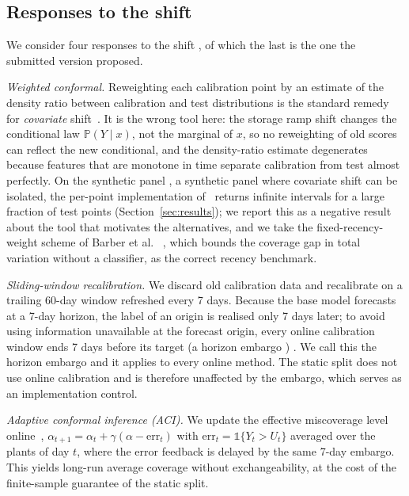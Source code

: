 \documentclass[preprint,3p,times]{elsarticle}
\providecommand{\DIFaddtex}[1]{{\protect\color{blue} \sf #1}} %
\providecommand{\DIFdeltex}[1]{{\protect\color{red} \scriptsize #1}} %
\providecommand{\DIFaddbegin}{} %
\providecommand{\DIFaddend}{} %
\providecommand{\DIFdelbegin}{} %
\providecommand{\DIFdelend}{} %
\providecommand{\DIFadd}[1]{\texorpdfstring{\DIFaddtex{#1}}{#1}} %
\providecommand{\DIFdel}[1]{\texorpdfstring{\DIFdeltex{#1}}{}} %
\begin{document}
\subsection{Responses to the shift}
\label{sec:respuestas}

\DIFaddend We consider four responses\DIFdelbegin \DIFdel{to the shift}\DIFdelend \DIFaddbegin \DIFadd{, of which the last is the one the submitted version proposed}\DIFaddend .

\emph{Weighted conformal.} Reweighting each calibration point by an estimate of the density ratio between calibration and test distributions is the standard remedy for \emph{covariate} shift~\cite{tibshirani2019}. It is the wrong tool here: the \DIFdelbegin \DIFdel{storage ramp }\DIFdelend \DIFaddbegin \DIFadd{shift }\DIFaddend changes the conditional law $\mathbb{P}(Y\mid x)$, not the marginal of $x$, so no reweighting of old scores can reflect the new conditional, and the density-ratio estimate degenerates because features that are monotone in time separate calibration from test almost perfectly. On \DIFdelbegin \DIFdel{the synthetic panel , }\DIFdelend \DIFaddbegin \DIFadd{a synthetic panel }\DIFaddend where covariate shift can be isolated, the per-point implementation \DIFdelbegin \DIFdel{of~\cite{tibshirani2019} }\DIFdelend returns infinite intervals for a large fraction of test points\DIFdelbegin \DIFdel{(Section~\ref{sec:results})}\DIFdelend ; we report this as a negative result \DIFaddbegin \DIFadd{about the tool }\DIFaddend that motivates the alternatives, and we take the fixed-recency-weight scheme of Barber et al.~\cite{barber2023} \DIFdelbegin \DIFdel{, which bounds the coverage gap in total variation without a classifier, }\DIFdelend as the correct recency benchmark.

\emph{Sliding-window recalibration.} We discard old calibration data and recalibrate on a trailing 60-day window refreshed every 7 days. Because the base model forecasts at a 7-day horizon, the label of an origin is realised only 7 days later; to avoid using information unavailable at the forecast origin, every online calibration window ends 7 days before its target\DIFdelbegin \DIFdel{(a horizon embargo )}\DIFdelend \DIFaddbegin \DIFadd{. We call this the horizon embargo and it applies to every online method}\DIFaddend . The static split does not use online calibration and is therefore unaffected\DIFdelbegin \DIFdel{by the embargo}\DIFdelend , which serves as an implementation control.

\emph{Adaptive conformal inference\DIFdelbegin \DIFdel{(ACI)}\DIFdelend .} We update the effective miscoverage level online~\cite{gibbs2021}, $\alpha_{t+1}=\alpha_t+\gamma(\alpha-\mathrm{err}_t)$ with $\mathrm{err}_t=\mathbb{1}\{Y_t>U_t\}$ \DIFaddbegin \DIFadd{averaged over the plants of day $t$}\DIFaddend , where the error feedback is delayed by the same 7-day embargo.
\DIFdelbegin \DIFdel{This yields long-run average coverage without exchangeability, at the cost of the finite-sample guarantee of the static split.
}\DIFdelend 
\end{document}
